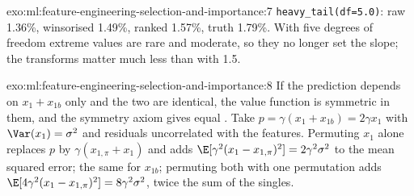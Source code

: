 \begin{solution}{exo:ml:feature-engineering-selection-and-importance:7}
\texttt{heavy\_tail(df=5.0)}: raw 1.36\%, winsorised 1.49\%, ranked 1.57\%, truth 1.79\%. With five degrees of freedom
extreme values are rare and moderate, so they no longer set the slope; the transforms matter much less than with 1.5.
\end{solution}

\begin{solution}{exo:ml:feature-engineering-selection-and-importance:8}
If the prediction depends on $x_1 + x_{1b}$ only and the two are identical, the value function is symmetric in them, and
the symmetry axiom gives equal . Take $p = \gamma(x_1 + x_{1b}) = 2\gamma x_1$ with $\Var(x_1) = \sigma^2$
and residuals uncorrelated with the features. Permuting $x_1$ alone replaces $p$ by $\gamma(x_{1,\pi} + x_1)$ and adds
$\E[\gamma^2(x_1 - x_{1,\pi})^2] = 2\gamma^2\sigma^2$ to the mean squared error; the same for $x_{1b}$; permuting both with
one permutation adds $\E[4\gamma^2(x_1 - x_{1,\pi})^2] = 8\gamma^2\sigma^2$, twice the sum of the singles.
\end{solution}

